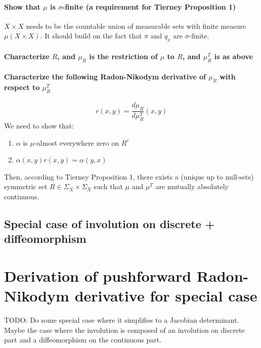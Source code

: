 \documentclass[twoside]{article}
\begin{document}
\paragraph{Show that $\mu$ is $\sigma$-finite (a requirement for Tierney Proposition 1)}
$X \times X$ needs to be the countable union of measurable sets with finite measure $\mu(X \times X)$.
It should build on the fact that $\pi$ and $q_x$ are $\sigma$-finite.

\paragraph{Characterize $R$, and $\mu_R$ is the restriction of $\mu$ to $R$, and $\mu_R^T$ is as above}


\paragraph{Characterize the following Radon-Nikodym derivative of $\mu_R$ with respect to $\mu_R^T$}
\[
r(x, y) = \frac{d\mu_R}{d\mu_R^T}(x, y)
\]
We need to show that:
\begin{enumerate}
\item $\alpha$ is $\mu$-almost everywhere zero on $R^c$
\item $\alpha(x, y) r(x, y) = \alpha(y, x)$
\end{enumerate}
Then, according to Tierney Proposition 1, there exists a (unique up to null-sets) symmetric set $R \in \Sigma_X \times \Sigma_X$ such that $\mu$ and $\mu^T$ are mutually absolutely continuous.

\subsection{Special case of involution on discrete + diffeomorphism}

\section{Derivation of pushforward Radon-Nikodym derivative for special case}
TODO: Do some special case where it simplifies to a Jacobian determinant.
Maybe the case where the involution is composed of an involution on discrete part and a diffeomorphism on the continuous part.
\end{document}
